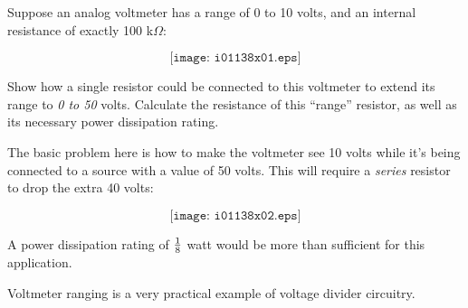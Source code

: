 

Suppose an analog voltmeter has a range of 0 to 10 volts, and an internal resistance of exactly 100 k$\Omega$:

$$\texttt{[image: i01138x01.eps]}$$

Show how a single resistor could be connected to this voltmeter to extend its range to {\it 0 to 50} volts.  Calculate the resistance of this ``range'' resistor, as well as its necessary power dissipation rating.







The basic problem here is how to make the voltmeter see 10 volts while it's being connected to a source with a value of 50 volts.  This will require a {\it series} resistor to drop the extra 40 volts:

$$\texttt{[image: i01138x02.eps]}$$

A power dissipation rating of ${1 \over 8}$ watt would be more than sufficient for this application.







Voltmeter ranging is a very practical example of voltage divider circuitry.




